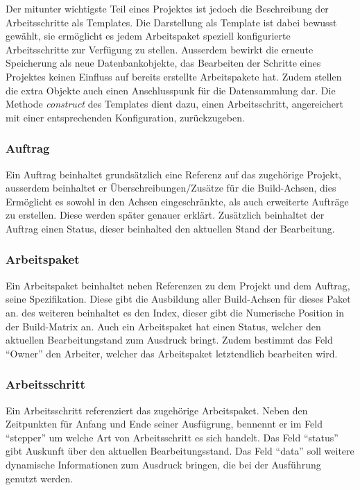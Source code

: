 Der mitunter wichtigste Teil eines Projektes ist jedoch die Beschreibung der Arbeitsschritte als Templates.
Die Darstellung als Template ist dabei bewusst gew\"ahlt,
sie erm\"oglicht es jedem Arbeitspaket speziell konfigurierte Arbeitsschritte zur Verf\"ugung zu stellen.
Ausserdem bewirkt die erneute Speicherung als neue Datenbankobjekte,
das Bearbeiten der Schritte eines Projektes keinen Einfluss auf bereits erstellte Arbeitspakete hat.
Zudem stellen die extra Objekte auch einen Anschlusspunk f\"ur die Datensammlung dar.
Die Methode \textit{construct} des Templates dient dazu,
einen Arbeitsschritt, angereichert mit einer entsprechenden Konfiguration, zur\"uckzugeben.

\subsubsection{Auftrag}

Ein Auftrag beinhaltet grunds\"atzlich eine Referenz auf das zugeh\"orige Projekt,
ausserdem beinhaltet er \"Uberschreibungen/Zus\"atze f\"ur die Build-Achsen,
dies Erm\"oglicht es sowohl in den Achsen eingeschr\"ankte,
als auch erweiterte Auftr\"age zu erstellen.
Diese werden sp\"ater genauer erkl\"art.
Zus\"atzlich beinhaltet der Auftrag einen Status, dieser beinhalted den aktuellen Stand der Bearbeitung.

\subsubsection{Arbeitspaket}
Ein Arbeitspaket beinhaltet neben Referenzen zu dem Projekt und dem Auftrag,
seine Spezifikation. Diese gibt die Ausbildung aller Build-Achsen f\"ur dieses Paket an.
des weiteren beinhaltet es den Index, dieser gibt die Numerische Position in der Build-Matrix an.
Auch ein Arbeitspaket hat einen Status, welcher den aktuellen Bearbeitungstand zum Ausdruck bringt.
Zudem bestimmt das Feld ``Owner'' den Arbeiter, welcher das Arbeitspaket letztendlich bearbeiten wird.

\subsubsection{Arbeitsschritt}

Ein Arbeitsschritt referenziert das zugeh\"orige Arbeitspaket.
Neben den Zeitpunkten f\"ur Anfang und Ende seiner Ausf\"ugrung,
bennennt er im Feld ``stepper'' um welche Art von Arbeitsschritt es sich handelt.
Das Feld ``status'' gibt Auskunft \"uber den aktuellen Bearbeitungsstand.
Das Feld ``data'' soll weitere dynamische Informationen zum Ausdruck bringen,
die bei der Ausf\"uhrung genutzt werden.

